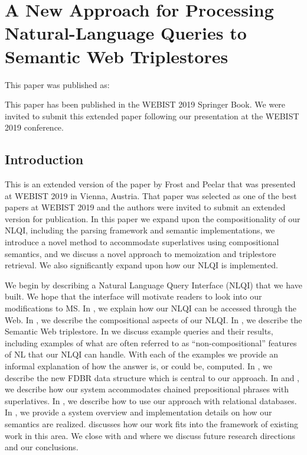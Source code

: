 \documentclass[../main.tex]{subfiles}
\begin{document}
\chapter{A New Approach for Processing Natural-Language Queries to Semantic Web Triplestores}
\begin{refsection}

This paper was published as:


This paper has been published in the WEBIST 2019 Springer Book.
We were invited to submit this extended paper following our presentation at the WEBIST 2019 conference.

\label{chapter:webist2019journal}

\section{Introduction}
\label{webist2019journal:intro}
This is an extended version of the paper by Frost and Peelar \cite{frostpeelar2019} that was presented at WEBIST 2019 in Vienna, Austria.  That paper was selected as one of the best papers at WEBIST 2019 and the authors were invited to submit an extended version for publication.  In this paper we expand upon the compositionality of our NLQI, including the parsing framework and semantic implementations, we introduce a novel method to accommodate superlatives using compositional semantics, and we discuss a novel approach to memoization and triplestore retrieval.  We also significantly expand upon how our NLQI is implemented.

\noindent We begin by describing a Natural Language Query Interface (NLQI) that we have built. We hope that the interface will motivate readers to look into our modifications to MS. In , we explain how our NLQI can be accessed through the Web. In , we describe the compositional aspects of our NLQI.  In , we describe the Semantic Web triplestore. In  we discuss example queries and their results, including examples of what are often referred to as ``non-compositional'' features of NL that our NLQI can handle. With each of the examples we provide an informal explanation of how the answer is, or could be, computed. In , we describe the new FDBR data structure which is central to our approach. In  and , we describe how our system accommodates chained prepositional phrases with superlatives.  In , we describe how to use our approach with relational databases. In , we provide a system overview and implementation details on how our semantics are realized.  discusses how our work fits into the framework of existing work in this area.  We close with  and  where we discuss future research directions and our conclusions.


\end{refsection}
\end{document}
